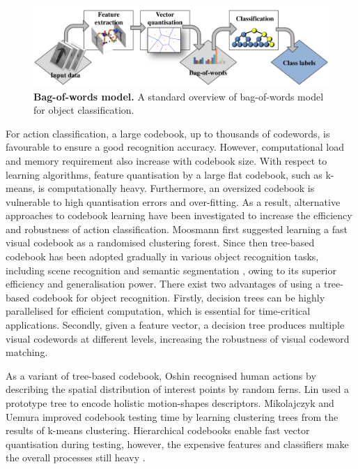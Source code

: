\begin{figure}[t]
	\centering  	
	\includegraphics[width=1\linewidth]{fig/act/bow.pdf}
	\caption{\textbf{Bag-of-words model.} A standard overview of bag-of-words model for object classification.}
	\label{fig/act/bow}
\end{figure}


For action classification, a large codebook, \eg up to thousands of codewords, is favourable to ensure a good recognition accuracy. However, computational load and memory requirement also increase with codebook size. With respect to learning algorithms, feature quantisation by a large flat codebook, such as k-means, is computationally heavy. Furthermore, an oversized codebook is vulnerable to high quantisation errors and over-fitting. As a result, alternative approaches to codebook learning have been investigated to increase the efficiency and robustness of action classification. Moosmann \etal \cite{Moosmann2007} first suggested learning a fast visual codebook as a randomised clustering forest. Since then tree-based codebook has been adopted gradually in various object recognition tasks, including scene recognition \cite{Bosch2007} and semantic segmentation \cite{Shotton2008}, owing to its superior efficiency and generalisation power. There exist two advantages of using a tree-based codebook for object recognition. Firstly, decision trees can be highly parallelised for efficient computation, which is essential for time-critical applications. Secondly, given a feature vector, a decision tree produces multiple visual codewords at different levels, increasing the robustness of visual codeword matching. 

As a variant of tree-based codebook, Oshin \etal \cite{Oshin2009} recognised human actions by describing the spatial distribution of interest points by random ferns. Lin \etal \cite{Lin2009} used a prototype tree to encode holistic motion-shapes descriptors.  Mikolajczyk and Uemura \cite{Mikolajczyk2008} improved codebook testing time by learning clustering trees from the results of k-means clustering. Hierarchical codebooks enable fast vector quantisation during testing, however, the expensive features and classifiers make the overall processes still heavy \cite{Lin2009, Mikolajczyk2008}.

